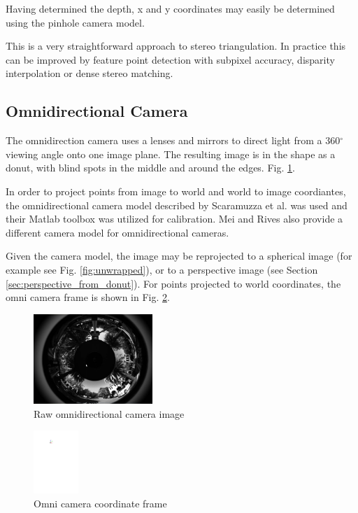 Having determined the depth, x and y coordinates may easily be determined using the pinhole camera model.

This is a very straightforward approach to stereo triangulation.  In practice this can be improved by feature point detection with subpixel accuracy, disparity interpolation or dense stereo matching.


\subsection{Omnidirectional Camera}

The omnidirection camera uses a lenses and mirrors to direct light from a 360$^{\circ}$ viewing angle onto one image plane.  The resulting image is in the shape as a donut, with blind spots in the middle and around the edges. Fig. \ref{fig:omni_donut}.

In order to project points from image to world and world to image coordiantes, the omnidirectional camera model described by Scaramuzza et al. \cite{scaramuzza_06} was used and their Matlab toolbox \cite{scaramuzza_06_02} was utilized for calibration. Mei and Rives also provide a different camera model for omnidirectional cameras.

Given the camera model, the image may be reprojected to a spherical image (for example see Fig. \ref{fig:unwrapped}), or to a perspective image (see Section \ref{sec:perspective_from_donut}).  For points projected to world coordinates, the omni camera frame is shown in Fig. \ref{fig:omni_coord_sys}.

\begin{figure}[h]
  \centering
    \includegraphics[width=0.4\textwidth]{chapters/images/donut}
  \caption{Raw omnidirectional camera image}
  \label{fig:omni_donut}
\end{figure}

\begin{figure}[h]
  \centering
    \includegraphics[width=0.15\textwidth]{chapters/images/omni_coord_sys}
  \caption{Omni camera coordinate frame}
  \label{fig:omni_coord_sys}
\end{figure}

